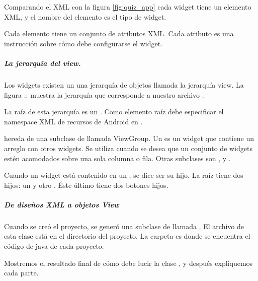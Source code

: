 Comparando el XML con la figura \ref{fig:quiz_app} cada widget tiene un elemento XML, y el
nombre del elemento es el tipo de widget.

Cada elemento tiene un conjunto de atributos XML. Cada atributo es una instrucción
sobre cómo debe configurarse el widget.


\subparagraph{La jerarquía del view.}
\label{\detokenize{dev_docs:la-jerarquia-del-view}}
Los widgets existen un una jerarquía de objetos  llamada la jerarquía
view. La figura :: muestra la jerarquía que corresponde a nuestro archivo
.

La raíz de esta jerarquía es un . Como elemento raíz debe especificar
el namespace XML de recursos de Android en .

 hereda de una subclase de  llamada ViewGroup. Un  es un
widget que contiene un arreglo con otros widgets. Se utiliza  cuando
se desea que un conjunto de widgets estén acomodados sobre una sola columna
o fila. Otras subclases  son ,  y .

Cuando un widget está contenido en un , se dice ser su hijo. La raíz
 tiene dos hijos: un  y otro . Éste último
tiene dos botones hijos.


\subparagraph{De diseños XML a objetos View}
\label{\detokenize{dev_docs:de-disenos-xml-a-objetos-view}}
Cuando se creó el proyecto, se generó una subclase de  llamada
. El archivo de esta clase está en el directorio  del
proyecto. La carpeta  es donde se encuentra el código de java de cada
proyecto.

Mostremos el resultado final de cómo debe lucir la clase ,
y después expliquemos cada parte.

